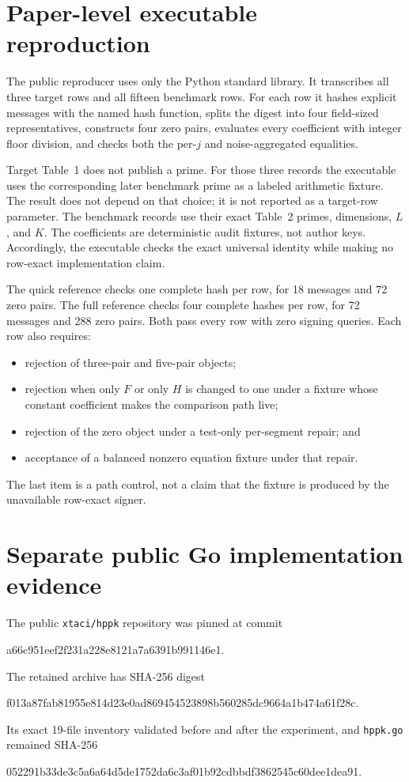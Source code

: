 \documentclass[10pt,a4paper]{article}
\begin{document}
\section{Paper-level executable reproduction}

The public reproducer uses only the Python standard library. It transcribes
all three target rows and all fifteen benchmark rows. For each row it hashes
explicit messages with the named hash function, splits the digest into four
field-sized representatives, constructs four zero pairs, evaluates every
coefficient with integer floor division, and checks both the per-$j$ and
noise-aggregated equalities.

Target Table~1 does not publish a prime. For those three records the executable
uses the corresponding later benchmark prime as a labeled arithmetic fixture.
The result does not depend on that choice; it is not reported as a target-row
parameter. The benchmark records use their exact Table~2 primes, dimensions,
$L$, and $K$. The coefficients are deterministic audit fixtures, not author
keys. Accordingly, the executable checks the exact universal identity while
making no row-exact implementation claim.

The quick reference checks one complete hash per row, for 18 messages and 72
zero pairs. The full reference checks four complete hashes per row, for 72
messages and 288 zero pairs. Both pass every row with zero signing queries.
Each row also requires:
\begin{itemize}
  \item rejection of three-pair and five-pair objects;
  \item rejection when only $F$ or only $H$ is changed to one under a fixture
        whose constant coefficient makes the comparison path live;
  \item rejection of the zero object under a test-only per-segment repair; and
  \item acceptance of a balanced nonzero equation fixture under that repair.
\end{itemize}
The last item is a path control, not a claim that the fixture is produced by
the unavailable row-exact signer.

\section{Separate public Go implementation evidence}

The public \texttt{xtaci/hppk} repository was pinned at commit~\cite{source}
\begin{center}
\small\ttfamily
a66c951eef2f231a228e8121a7a6391b991146e1.
\end{center}
The retained archive has SHA-256 digest
\begin{center}
\small\ttfamily
f013a87fab81955e814d23e0ad869454523898b560285dc9664a1b474a61f28c.
\end{center}
Its exact 19-file inventory validated before and after the experiment, and
\texttt{hppk.go} remained SHA-256
\begin{center}
\small\ttfamily
052291b33de3c5a6a64d5de1752da6c3af01b92cdbbdf3862545c60dee1dea91.
\end{center}
\end{document}

